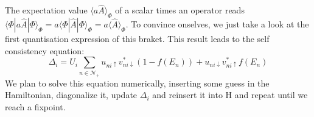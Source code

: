 \documentclass[../main.tex]{subfile}
\begin{document}
The expectation value $\langle a\hat{A}\rangle_{\Phi}$ of a scalar times an operator reads $\langle \Phi|a \hat{A}|\Phi\rangle_{\Phi} = a \langle \Phi|\hat{A}|\Phi\rangle_{\Phi} = a \langle \hat{A}\rangle_{\Phi}$. 
To convince onselves, we just take a look at the first quantisation expression of this braket. This result leads to the self consistency equation:
\[
    \Delta_i = U_i\sum_{n\in\mathcal{N}_+} u_{ni\uparrow} v_{ni\downarrow}^{\ast} \left(1-f(E_n)\right) + u_{ni\downarrow} v_{ni\uparrow}^{\ast}f(E_n)
\]
We plan to solve this equation numerically, inserting some guess in the Hamiltonian, diagonalize it, update $\Delta_i$ and reinsert it into H and repeat until we reach a fixpoint.\\
\end{document}
